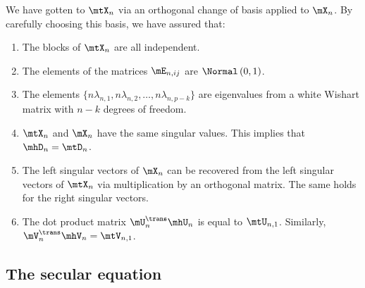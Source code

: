 We have gotten to $\mtX_n$ via an orthogonal change of basis applied to $\mX_n$.  By carefully choosing this basis, we have assured that:
\begin{enumerate}
    \item The blocks of $\mtX_n$ are all independent.
    \item The elements of the matrices $\mE_{n,ij}$ are 
        \iid $\Normal\left( 0, 1 \right)$.
    \item The elements 
        $\{ n \lambda_{n,1}, n \lambda_{n,2}, \ldots, 
            n \lambda_{n,p-k} \}$ are eigenvalues from
        a white Wishart matrix with $n-k$ degrees of freedom.
    \item $\mtX_n$ and $\mX_n$ have the same singular values.  This implies
        that $\mhD_n = \mtD_n$.
    \item The left singular vectors of $\mX_n$ can be recovered from the
        left singular vectors of $\mtX_n$ via multiplication by an orthogonal
        matrix.  The same holds for the right singular vectors.
    \item The dot product matrix $\mU_n^\trans \mhU_n$ is equal to
        $\mtU_{n,1}$.
        Similarly, $\mV_n^\trans \mhV_n = \mtV_{n,1}$.
\end{enumerate}

\subsection{The secular equation}

